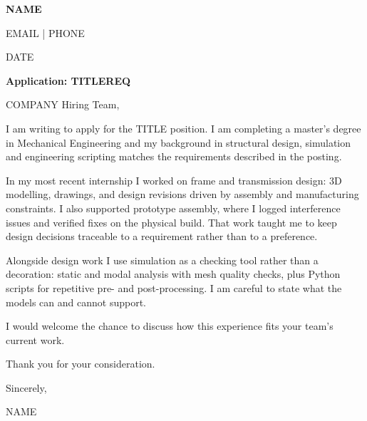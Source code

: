 \documentclass[a4paper,11pt]{article}
\begin{document}
{\LARGE\bfseries {{NAME}}}\par
{{EMAIL}} | {{PHONE}}\par
{{DATE}}
\par
{\large\bfseries\color{accent}Application: {{TITLE}}{{REQ}}}\par
{{COMPANY}} Hiring Team,
\par
I am writing to apply for the {{TITLE}} position. I am completing a master's degree in Mechanical
Engineering and my background in structural design, simulation and engineering scripting matches the
requirements described in the posting.
\par
In my most recent internship I worked on frame and transmission design: 3D modelling, drawings, and
design revisions driven by assembly and manufacturing constraints. I also supported prototype assembly,
where I logged interference issues and verified fixes on the physical build. That work taught me to keep
design decisions traceable to a requirement rather than to a preference.
\par
Alongside design work I use simulation as a checking tool rather than a decoration: static and modal
analysis with mesh quality checks, plus Python scripts for repetitive pre- and post-processing. I am
careful to state what the models can and cannot support.
\par
I would welcome the chance to discuss how this experience fits your team's current work.
\par
Thank you for your consideration.
\par
Sincerely,\par
{{NAME}}
\end{document}

